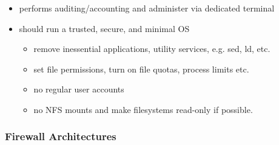 \documentclass[twocolumn,landscape,10pt]{article}
\theoremstyle{definition}
\begin{document}
\begin{itemize}
    \item performs auditing/accounting and administer via dedicated
        terminal
    \item should run a trusted, secure, and minimal OS
        \begin{itemize}
            \item remove inessential applications, utility services, e.g. sed,
                ld, etc.
            \item set file permissions, turn on file quotas, process limits etc.
            \item no regular user accounts
            \item no NFS mounts and make filesystems read-only if possible.
        \end{itemize} 
\end{itemize} 

\subsubsection{Firewall Architectures}
\end{document}
